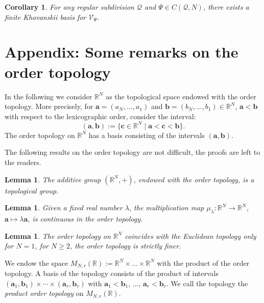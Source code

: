 \documentclass[12pt, a4article]{amsart}   	%
\numberwithin{equation}{section}
\theoremstyle{plain}
\newtheorem{corollary}[theorem]{Corollary}
\newtheorem{lemma}[theorem]{Lemma}
\theoremstyle{definition}
\newcommand{\bc}{\mathbf{c}}
\newcommand{\ba}{\mathbf{a}}
\newcommand{\bb}{\mathbf{b}}
\begin{document}
\begin{corollary}
For any regular subdivision $\mathcal{Q}$ and $\Psi\in C(\mathcal{Q},N)$, there exists a finite Khovanskii basis for $\mathcal{V}_{\Psi}$.
\end{corollary}



\appendix
\section{Appendix: Some remarks on the order topology}\label{order:topology}

In the following we consider $\mathbb{R}^N$ as the topological space endowed with the order topology.
More precisely, for $\ba=(a_N,\ldots,a_1)$ and $\bb=(b_N,\ldots,b_1)\in\mathbb{R}^N$, $\ba<\bb$ 
with respect to the lexicographic order, consider the interval:
$$
(\ba,\bb):=\{\bc\in\mathbb{R}^N\mid \ba<\bc<\bb\}.
$$
The order topology on $\mathbb{R}^N$ has a basis consisting of the intervals $(\ba,\bb)$.

The following results on the order topology are not difficult, the proofs are left to the readers.

\begin{lemma}\label{Lem:TopGroup}
The additive group $(\mathbb R^N,+)$, endowed with the order topology, is a topological group. 
\end{lemma}


\begin{lemma}
Given a fixed real number $\lambda$, the multiplication map $\mu_\lambda:\mathbb{R}^N\rightarrow \mathbb{R}^N$, $\ba\mapsto \lambda\ba$, is continuous in the order topology.
\end{lemma}

\begin{lemma}\label{finer_topology}
The order topology on $\mathbb{R}^N$ coincides with the Euclidean topology only for $N=1$, for
$N\ge 2$, the order topology is strictly finer.
\end{lemma}



We endow the space $M_{N,r}(\mathbb R):=\mathbb{R}^N\times\ldots\times \mathbb{R}^N$ with 
the product of the order topology.  A basis of the topology consists of the product of intervals $(\ba_1,\bb_1)\times \cdots\times (\ba_r,\bb_r)$ with $\ba_1<\bb_1$, $\ldots$, $\ba_r<\bb_r$. We call the topology the \emph{product order topology} on $M_{N,r}(\mathbb R)$. 
\end{document}
